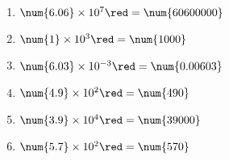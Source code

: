     \begin{enumerate}
        \item $\num{6.06}\times 10^{7} {\red = \num{60600000}}$
        \item $\num{1}   \times 10^{3} {\red = \num{1000}}$
        \item $\num{6.03}\times 10^{-3}{\red = \num{0.00603}}$
        \item $\num{4.9} \times 10^{2} {\red = \num{490}}$
        \item $\num{3.9} \times 10^{4} {\red = \num{39000}}$
        \item $\num{5.7} \times 10^{2} {\red = \num{570}}$
    \end{enumerate}
